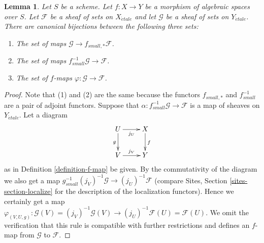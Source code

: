 \documentclass{stacks-project}
\theoremstyle{plain}
\newtheorem{lemma}[subsection]{Lemma}
\theoremstyle{definition}
\theoremstyle{remark}
\numberwithin{equation}{subsection}
\def\etale{{\acute{e}tale}}
\begin{document}
\begin{lemma}
\label{lemma-f-map}
Let $S$ be a scheme.
Let $f : X \to Y$ be a morphism of algebraic spaces over $S$.
Let $\mathcal{F}$ be a sheaf of sets on $X_\etale$ and
let $\mathcal{G}$ be a sheaf of sets on $Y_\etale$.
There are canonical bijections between the following three sets:
\begin{enumerate}
\item The set of maps $\mathcal{G} \to f_{small, *}\mathcal{F}$.
\item The set of maps $f_{small}^{-1}\mathcal{G} \to \mathcal{F}$.
\item The set of $f$-maps $\varphi : \mathcal{G} \to \mathcal{F}$.
\end{enumerate}
\end{lemma}

\begin{proof}
Note that (1) and (2) are the same because the functors $f_{small, *}$
and $f_{small}^{-1}$ are a pair of adjoint functors.
Suppose that $\alpha : f_{small}^{-1}\mathcal{G} \to \mathcal{F}$
is a map of sheaves on $Y_\etale$. Let a diagram
$$
\xymatrix{
U \ar[d]_g \ar[r]_{j_U} & X \ar[d]^f \\
V \ar[r]^{j_V} & Y
}
$$
as in Definition \ref{definition-f-map} be given.
By the commutativity of the diagram we also get a map
$g_{small}^{-1}(j_V)^{-1}\mathcal{G} \to (j_U)^{-1}\mathcal{F}$
(compare Sites, Section \ref{sites-section-localize} for the
description of the localization functors). Hence we certainly
get a map
$\varphi_{(V, U, g)} :
\mathcal{G}(V) = (j_V)^{-1}\mathcal{G}(V)
\to
(j_U)^{-1}\mathcal{F}(U) = \mathcal{F}(U)$.
We omit the verification that this rule is compatible with
further restrictions and defines an $f$-map from $\mathcal{G}$ to
$\mathcal{F}$.


\end{proof}
\end{document}

